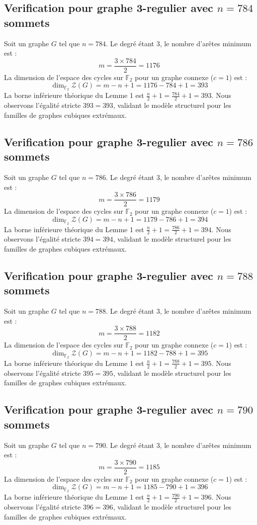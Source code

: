 \documentclass[11pt,a4paper]{article}
\begin{document}
\subsection{Verification pour graphe 3-regulier avec $n=784$ sommets}
Soit un graphe $G$ tel que $n = 784$. Le degré étant 3, le nombre d'arêtes minimum est :
$$ m = \frac{3 \times 784}{2} = 1176 $$
La dimension de l'espace des cycles sur $\mathbb{F}_2$ pour un graphe connexe ($c=1$) est :
$$ \dim_{\mathbb{F}_2} \mathcal{Z}(G) = m - n + 1 = 1176 - 784 + 1 = 393 $$
La borne inférieure théorique du Lemme 1 est $\frac{n}{2} + 1 = \frac{784}{2} + 1 = 393$.
Nous observons l'égalité stricte $393 = 393$, validant le modèle structurel pour les familles de graphes cubiques extrémaux.

\subsection{Verification pour graphe 3-regulier avec $n=786$ sommets}
Soit un graphe $G$ tel que $n = 786$. Le degré étant 3, le nombre d'arêtes minimum est :
$$ m = \frac{3 \times 786}{2} = 1179 $$
La dimension de l'espace des cycles sur $\mathbb{F}_2$ pour un graphe connexe ($c=1$) est :
$$ \dim_{\mathbb{F}_2} \mathcal{Z}(G) = m - n + 1 = 1179 - 786 + 1 = 394 $$
La borne inférieure théorique du Lemme 1 est $\frac{n}{2} + 1 = \frac{786}{2} + 1 = 394$.
Nous observons l'égalité stricte $394 = 394$, validant le modèle structurel pour les familles de graphes cubiques extrémaux.

\subsection{Verification pour graphe 3-regulier avec $n=788$ sommets}
Soit un graphe $G$ tel que $n = 788$. Le degré étant 3, le nombre d'arêtes minimum est :
$$ m = \frac{3 \times 788}{2} = 1182 $$
La dimension de l'espace des cycles sur $\mathbb{F}_2$ pour un graphe connexe ($c=1$) est :
$$ \dim_{\mathbb{F}_2} \mathcal{Z}(G) = m - n + 1 = 1182 - 788 + 1 = 395 $$
La borne inférieure théorique du Lemme 1 est $\frac{n}{2} + 1 = \frac{788}{2} + 1 = 395$.
Nous observons l'égalité stricte $395 = 395$, validant le modèle structurel pour les familles de graphes cubiques extrémaux.

\subsection{Verification pour graphe 3-regulier avec $n=790$ sommets}
Soit un graphe $G$ tel que $n = 790$. Le degré étant 3, le nombre d'arêtes minimum est :
$$ m = \frac{3 \times 790}{2} = 1185 $$
La dimension de l'espace des cycles sur $\mathbb{F}_2$ pour un graphe connexe ($c=1$) est :
$$ \dim_{\mathbb{F}_2} \mathcal{Z}(G) = m - n + 1 = 1185 - 790 + 1 = 396 $$
La borne inférieure théorique du Lemme 1 est $\frac{n}{2} + 1 = \frac{790}{2} + 1 = 396$.
Nous observons l'égalité stricte $396 = 396$, validant le modèle structurel pour les familles de graphes cubiques extrémaux.
\end{document}
